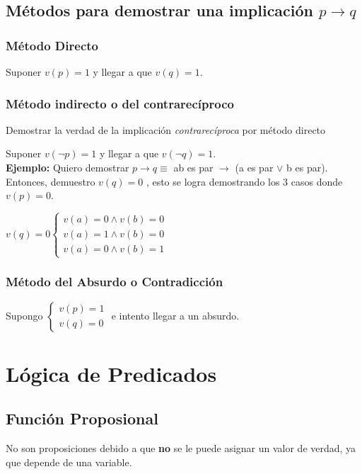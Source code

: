 \documentclass[a4paper, twoside]{article}
\begin{document}
\subsection{Métodos para demostrar una implicación $p \to q$}
\subsubsection{Método Directo}
Suponer $v(p) = 1$ y llegar a que $v(q) = 1$.

\subsubsection{Método indirecto o del contrarecíproco}
Demostrar la verdad de la implicación \emph{contrarecíproca} por método directo

Suponer $v(\lnot p) = 1$ y llegar a que $v(\lnot q) = 1$.\\

\textbf{Ejemplo:} Quiero demostrar $p \to q \equiv$ ab es par $\to$ (a es par $\lor$ b es par).
Entonces, demuestro $v(q) = 0$ , esto se logra demostrando los 3 casos donde $v(p) = 0$.

\begin{center}
	$v(q)=0\left\{ \begin{array}{c}
	v(a)=0\wedge v(b)=0\\
	v(a)=1\wedge v(b)=0\\
	v(a)=0\wedge v(b)=1\end{array}\right.$
\end{center}

\subsubsection{Método del Absurdo o Contradicción}
Supongo $\left\{ \begin{array}{c} v(p)=1\\ v(q)=0\end{array}\right.$ e intento llegar a un absurdo.

\newpage
\section{Lógica de Predicados}
\subsection{Función Proposional}
No son proposiciones debido a que \textbf{no} se le puede asignar un valor de verdad, ya que depende de una variable.\\
\end{document}
